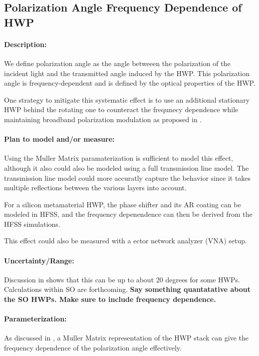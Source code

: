 \subsection{Polarization Angle Frequency Dependence of HWP}

\paragraph{Description:}

We define polarization angle as the angle betweeen the polarization of the incident light and the transmitted angle induced by the HWP. This polarization angle is frequency-dependent and is defined by the optical properties of the HWP.

One strategy to mitigate this systematic effect is to use an additional stationary HWP behind the rotating one to counteract the frequnecy dependence while maintaining broadband polarization modulation as proposed in \cite{Matsumura14}. 

\paragraph{Plan to model and/or measure:}
Using the Muller Matrix paramaterization is sufficient to model this effect, although it also could also be modeled using a full transmission line model. The transmission line model could more accuratly capture the behavior since it takes multiple reflections between the various layers into account.

For a silicon metamaterial HWP, the phase shifter and its AR coating can be modeled in HFSS, and the frequency depenendence can then be derived from the HFSS simulations.

This effect could also be measured with a ector network analyzer (VNA) setup.

\paragraph{Uncertainty/Range:}
Discussion in \cite{Matsumura09} shows that this can be up to about 20 degrees for some HWPs. Calculations within SO are forthcoming. \textbf{Say something quantatative about the SO HWPs. Make sure to include frequency dependence.}

\paragraph{Parameterization:}

As discussed in \cite{Matsumura09}, a Muller Matrix representation of the HWP stack can give the frequency dependence of the polarization angle effectively.


